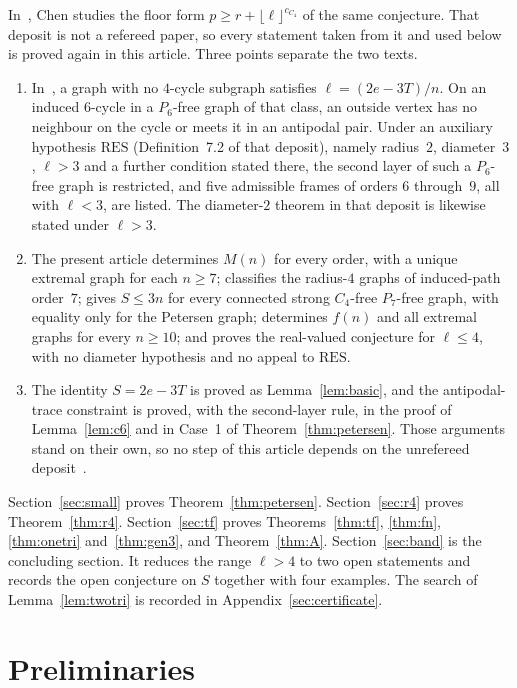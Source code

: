 \documentclass[ASNA]{USG}
\theoremstyle{WBstyletwo}
\numberwithin{equation}{section}
\newcommand{\lr}{\ell}
\newcommand{\pp}{p}
\begin{document}
In~\cite{chen}, Chen studies the floor form $\pp\ge r+\lfloor\lr\rfloor^{c_{C_4}}$ of the same conjecture. That deposit is not a refereed paper, so every statement taken from it and used below is proved again in this article. Three points separate the two texts.
\begin{enumerate}
\item In~\cite{chen}, a graph with no $4$-cycle subgraph satisfies $\lr=(2e-3T)/n$. On an induced $6$-cycle in a $P_6$-free graph of that class, an outside vertex has no neighbour on the cycle or meets it in an antipodal pair. Under an auxiliary hypothesis $\mathrm{RES}$ (Definition~7.2 of that deposit), namely radius~$2$, diameter~$3$, $\lr>3$ and a further condition stated there, the second layer of such a $P_6$-free graph is restricted, and five admissible frames of orders $6$ through~$9$, all with $\lr<3$, are listed. The diameter-$2$ theorem in that deposit is likewise stated under $\lr>3$.
\item The present article determines $M(n)$ for every order, with a unique extremal graph for each $n\ge 7$; classifies the radius-$4$ graphs of induced-path order~$7$; gives $S\le 3n$ for every connected strong $C_4$-free $P_7$-free graph, with equality only for the Petersen graph; determines $f(n)$ and all extremal graphs for every $n\ge 10$; and proves the real-valued conjecture for $\lr\le 4$, with no diameter hypothesis and no appeal to $\mathrm{RES}$.
\item The identity $S=2e-3T$ is proved as Lemma~\ref{lem:basic}, and the antipodal-trace constraint is proved, with the second-layer rule, in the proof of Lemma~\ref{lem:c6} and in Case~1 of Theorem~\ref{thm:petersen}. Those arguments stand on their own, so no step of this article depends on the unrefereed deposit~\cite{chen}.
\end{enumerate}

Section~\ref{sec:small} proves Theorem~\ref{thm:petersen}. Section~\ref{sec:r4} proves Theorem~\ref{thm:r4}. Section~\ref{sec:tf} proves Theorems~\ref{thm:tf}, \ref{thm:fn}, \ref{thm:onetri} and~\ref{thm:gen3}, and Theorem~\ref{thm:A}. Section~\ref{sec:band} is the concluding section. It reduces the range $\lr>4$ to two open statements and records the open conjecture on $S$ together with four examples. The search of Lemma~\ref{lem:twotri} is recorded in Appendix~\ref{sec:certificate}.

\section{Preliminaries}\label{sec:prelim}
\end{document}

